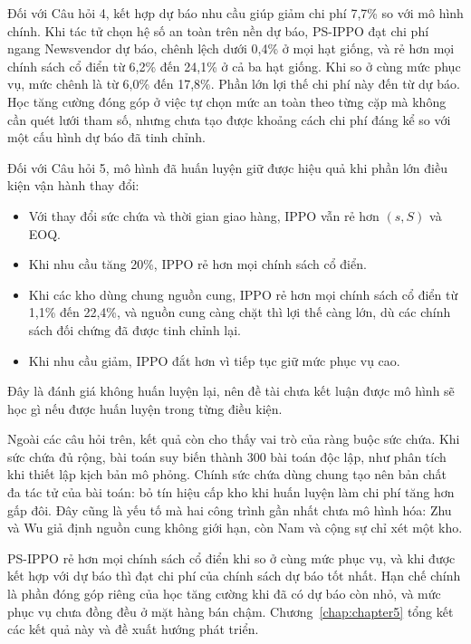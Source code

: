 Đối với Câu hỏi 4, kết hợp dự báo nhu cầu giúp giảm chi phí 7,7\% so với mô hình chính. Khi tác tử chọn hệ số an toàn trên nền dự báo, PS-IPPO đạt chi phí ngang Newsvendor dự báo, chênh lệch dưới 0,4\% ở mọi hạt giống, và rẻ hơn mọi chính sách cổ điển từ 6,2\% đến 24,1\% ở cả ba hạt giống. Khi so ở cùng mức phục vụ, mức chênh là từ 6,0\% đến 17,8\%. Phần lớn lợi thế chi phí này đến từ dự báo. Học tăng cường đóng góp ở việc tự chọn mức an toàn theo từng cặp mà không cần quét lưới tham số, nhưng chưa tạo được khoảng cách chi phí đáng kể so với một cấu hình dự báo đã tinh chỉnh.

Đối với Câu hỏi 5, mô hình đã huấn luyện giữ được hiệu quả khi phần lớn điều kiện vận hành thay đổi:
\begin{itemize}
    \item Với thay đổi sức chứa và thời gian giao hàng, IPPO vẫn rẻ hơn $(s,S)$ và EOQ.
    \item Khi nhu cầu tăng 20\%, IPPO rẻ hơn mọi chính sách cổ điển.
    \item Khi các kho dùng chung nguồn cung, IPPO rẻ hơn mọi chính sách cổ điển từ 1,1\% đến 22,4\%, và nguồn cung càng chặt thì lợi thế càng lớn, dù các chính sách đối chứng đã được tinh chỉnh lại.
    \item Khi nhu cầu giảm, IPPO đắt hơn vì tiếp tục giữ mức phục vụ cao.
\end{itemize}

Đây là đánh giá không huấn luyện lại, nên đề tài chưa kết luận được mô hình sẽ học gì nếu được huấn luyện trong từng điều kiện.

Ngoài các câu hỏi trên, kết quả còn cho thấy vai trò của ràng buộc sức chứa. Khi sức chứa đủ rộng, bài toán suy biến thành 300 bài toán độc lập, như phân tích khi thiết lập kịch bản mô phỏng. Chính sức chứa dùng chung tạo nên bản chất đa tác tử của bài toán: bỏ tín hiệu cấp kho khi huấn luyện làm chi phí tăng hơn gấp đôi. Đây cũng là yếu tố mà hai công trình gần nhất chưa mô hình hóa: Zhu và Wu \cite{zhu2026spatiotemporal} giả định nguồn cung không giới hạn, còn Nam và cộng sự \cite{jeong2026alca} chỉ xét một kho.

\FloatBarrier
PS-IPPO rẻ hơn mọi chính sách cổ điển khi so ở cùng mức phục vụ, và khi được kết hợp với dự báo thì đạt chi phí của chính sách dự báo tốt nhất. Hạn chế chính là phần đóng góp riêng của học tăng cường khi đã có dự báo còn nhỏ, và mức phục vụ chưa đồng đều ở mặt hàng bán chậm. Chương~\ref{chap:chapter5} tổng kết các kết quả này và đề xuất hướng phát triển.
